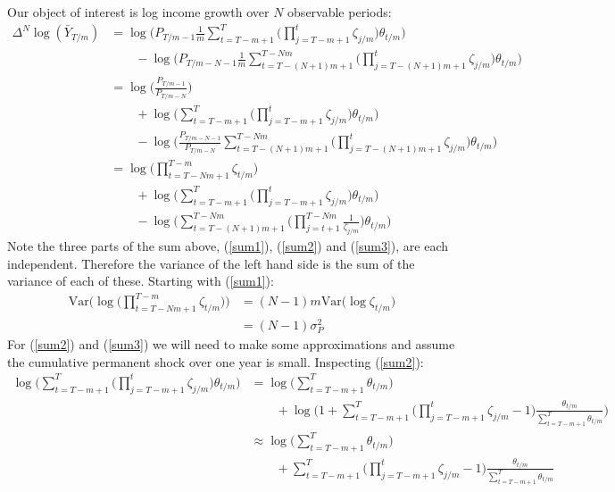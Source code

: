 Our object of interest is log income growth over $N$ observable periods:
\begin{align}
\Delta^N \log(\bar{Y}_{T/m}) &=  \log\Bigg(P_{T/m-1} \frac{1}{m} \sum_{t=T-m+1}^{T} \Big(\prod_{j=T-m+1}^{t} \zeta_{j/m}\Big) \theta_{t/m} \Bigg) \nonumber \\
& \qquad - \log\Bigg(P_{T/m-N-1} \frac{1}{m} \sum_{t=T-(N+1)m+1}^{T-Nm} \Big(\prod_{j=T-(N+1)m+1}^{t} \zeta_{j/m}\Big) \theta_{t/m} \Bigg) \nonumber \\
&=  \log \Bigg( \frac{P_{T/m-1}}{P_{T/m-N}} \Bigg) \nonumber \\
& \qquad +\log\Bigg( \sum_{t=T-m+1}^{T} \Big(\prod_{j=T-m+1}^{t} \zeta_{j/m}\Big) \theta_{t/m} \Bigg) \nonumber \\
& \qquad - \log\Bigg(\frac{P_{T/m-N-1}}{P_{T/m-N}}  \sum_{t=T-(N+1)m+1}^{T-Nm} \Big(\prod_{j=T-(N+1)m+1}^{t} \zeta_{j/m}\Big) \theta_{t/m} \Bigg) \nonumber \\
&=  \log \Bigg(  \prod_{t=T-Nm+1}^{T-m} \zeta_{t/m} \Bigg) \label{sum1} \\
& \qquad +\log\Bigg( \sum_{t=T-m+1}^{T} \Big(\prod_{j=T-m+1}^{t} \zeta_{j/m}\Big) \theta_{t/m} \Bigg) \label{sum2} \\
& \qquad - \log\Bigg(  \sum_{t=T-(N+1)m+1}^{T-Nm} \Big(\prod_{j=t+1}^{T-Nm} \frac{1}{\zeta_{j/m}}\Big) \theta_{t/m} \Bigg) \label{sum3}
\end{align}
Note the three parts of the sum above, (\ref{sum1}), (\ref{sum2}) and (\ref{sum3}), are each independent. Therefore the variance of the left hand side is the sum of the variance of each of these. Starting with (\ref{sum1}):
\begin{align*}
\mathrm{Var} \Bigg(\log \Bigg(  \prod_{t=T-Nm+1}^{T-m} \zeta_{t/m} \Bigg)\Bigg) &= (N-1)m\mathrm{Var}\Bigg( \log  \zeta_{t/m} \Bigg) \\
&= (N-1) \sigma^2_P
\end{align*}
For (\ref{sum2}) and (\ref{sum3}) we will need to make some approximations and assume the cumulative permanent shock over one year is small. Inspecting (\ref{sum2}):
\begin{align}
\log\Bigg( \sum_{t=T-m+1}^{T} \Big(\prod_{j=T-m+1}^{t} \zeta_{j/m}\Big) \theta_{t/m} \Bigg) &= \log\Bigg(  \sum_{t=T-m+1}^{T} \theta_{t/m} \Bigg) \\
& \qquad+ \log\Bigg(1+  \sum_{t=T-m+1}^{T} \Big(\prod_{j=T-m+1}^{t} \zeta_{j/m} -1\Big) \frac{\theta_{t/m} }{\sum_{t=T-m+1}^{T} \theta_{t/m}}\Bigg) \\
&\approx \log\Bigg(  \sum_{t=T-m+1}^{T} \theta_{t/m} \Bigg) \label{sum4}\\
& \qquad+  \sum_{t=T-m+1}^{T} \Big(\prod_{j=T-m+1}^{t} \zeta_{j/m} -1\Big) \frac{\theta_{t/m} }{\sum_{t=T-m+1}^{T} \theta_{t/m}} \label{sum5}
\end{align}
